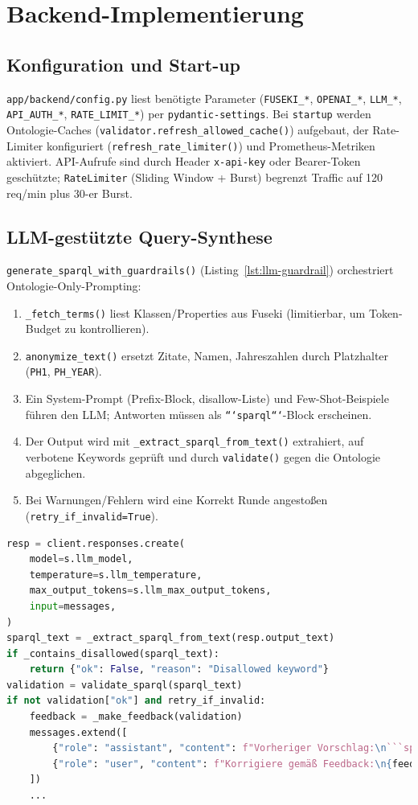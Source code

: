 \section{Backend-Implementierung}

\subsection{Konfiguration und Start-up}
\texttt{app/backend/config.py} liest benötigte Parameter (\texttt{FUSEKI\_*}, \texttt{OPENAI\_*}, \texttt{LLM\_*}, \texttt{API\_AUTH\_*}, \texttt{RATE\_LIMIT\_*}) per \texttt{pydantic-settings}. Bei \texttt{startup} werden Ontologie-Caches (\texttt{validator.refresh\_allowed\_cache()}) aufgebaut, der Rate-Limiter konfiguriert (\texttt{refresh\_rate\_limiter()}) und Prometheus-Metriken aktiviert. API-Aufrufe sind durch Header \texttt{x-api-key} oder Bearer-Token geschützte; \texttt{RateLimiter} (Sliding Window + Burst) begrenzt Traffic auf 120 req/min plus 30-er Burst.

\subsection{LLM-gestützte Query-Synthese}
\texttt{generate\_sparql\_with\_guardrails()} (Listing~\ref{lst:llm-guardrail}) orchestriert Ontologie-Only-Prompting:
\begin{enumerate}
  \item \texttt{\_fetch\_terms()} liest Klassen/Properties aus Fuseki (limitierbar, um Token-Budget zu kontrollieren).
  \item \texttt{anonymize\_text()} ersetzt Zitate, Namen, Jahreszahlen durch Platzhalter (\texttt{PH1}, \texttt{PH\_YEAR}).
  \item Ein System-Prompt (Prefix-Block, disallow-Liste) und Few-Shot-Beispiele führen den LLM; Antworten müssen als \texttt{```sparql```}-Block erscheinen.
  \item Der Output wird mit \texttt{\_extract\_sparql\_from\_text()} extrahiert, auf verbotene Keywords geprüft und durch \texttt{validate()} gegen die Ontologie abgeglichen.
  \item Bei Warnungen/Fehlern wird eine Korrekt Runde angestoßen (\texttt{retry\_if\_invalid=True}).
\end{enumerate}

\begin{lstlisting}[language=python,basicstyle=\ttfamily\small,caption={Guardrails im LLM-Service},label={lst:llm-guardrail}]
resp = client.responses.create(
    model=s.llm_model,
    temperature=s.llm_temperature,
    max_output_tokens=s.llm_max_output_tokens,
    input=messages,
)
sparql_text = _extract_sparql_from_text(resp.output_text)
if _contains_disallowed(sparql_text):
    return {"ok": False, "reason": "Disallowed keyword"}
validation = validate_sparql(sparql_text)
if not validation["ok"] and retry_if_invalid:
    feedback = _make_feedback(validation)
    messages.extend([
        {"role": "assistant", "content": f"Vorheriger Vorschlag:\n```sparql\n{sparql_text}\n```"},
        {"role": "user", "content": f"Korrigiere gemäß Feedback:\n{feedback}\nNur gültigen ```sparql``` Codeblock ausgeben."},
    ])
    ...
\end{lstlisting}

